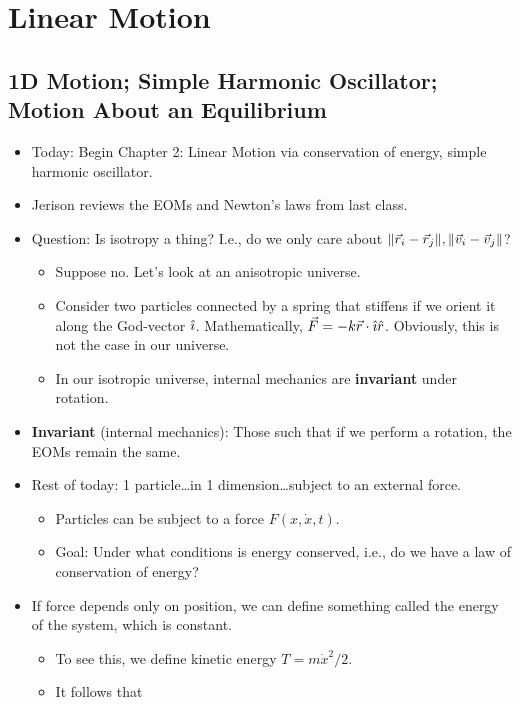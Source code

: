 \documentclass[../notes.tex]{subfiles}
\begin{document}
\chapter{Linear Motion}
\section{1D Motion; Simple Harmonic Oscillator; Motion About an Equilibrium}
\begin{itemize}
    \item {}Today: Begin Chapter 2: Linear Motion via conservation of energy, simple harmonic oscillator.
    \item Jerison reviews the EOMs and Newton's laws from last class.
    \item Question: Is isotropy a thing? I.e., do we only care about $\norm{\vec{r}_i-\vec{r}_j},\norm{\vec{v}_i-\vec{v}_j}$?
    \begin{itemize}
        \item Suppose no. Let's look at an anisotropic universe.
        \item Consider two particles connected by a spring that stiffens if we orient it along the God-vector $\hat{\imath}$. Mathematically, $\vec{F}=-k\vec{r}\cdot\hat{\imath}\hat{r}$. Obviously, this is not the case in our universe.
        \item In our isotropic universe, internal mechanics are \textbf{invariant} under rotation.
    \end{itemize}
    \item \textbf{Invariant} (internal mechanics): Those such that if we perform a rotation, the EOMs remain the same.
    \item Rest of today: 1 particle\dots in 1 dimension\dots subject to an external force.
    \begin{itemize}
        \item Particles can be subject to a force $F(x,\dot{x},t)$.
        \item Goal: Under what conditions is energy conserved, i.e., do we have a law of conservation of energy?
    \end{itemize}
    \item If force depends only on position, we can define something called the energy of the system, which is constant.
    \begin{itemize}
        \item To see this, we define kinetic energy $T=m\dot{x}^2/2$.
        \item It follows that

\end{itemize}
\end{itemize}
\end{document}
